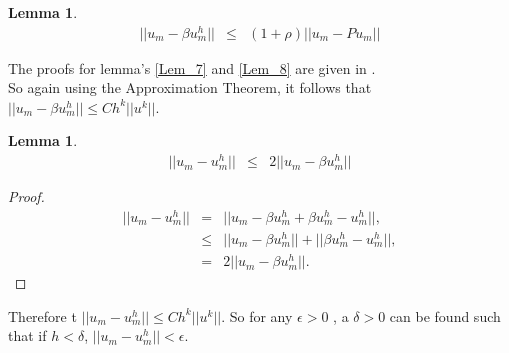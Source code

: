 \documentclass[../../main.tex]{subfiles}
\begin{document}
\newtheorem{Lem_8}[Lem_1]{Lemma} \label{Lem_8}
\begin{Lem_8}
	\begin{eqnarray*}
		||u_{m} - \beta u_{m}^{h}|| &\leq & \left(1+\rho\right)||u_{m}-Pu_{m}||
	\end{eqnarray*}
\end{Lem_8}
\begin{comment}
\begin{proof}
	\begin{eqnarray*}
	||u_{m} - \beta u_{m}^{h}|| & \leq & ||u_{m}-Pu_{m}|| + ||Pu_{m} - \beta u_{m}^{h}|| \\
				& \leq & \left(1+\rho\right)||u_{m}-Pu_{m}|| \ \ \textrm{ (by Lemma \ref{Lem_7})}
	\end{eqnarray*}
\end{proof}
\end{comment}

The proofs for lemma's \ref{Lem_7} and \ref{Lem_8} are given in \cite{SF73}.\\

So again using the Approximation Theorem, it follows that $||u_{m} - \beta u_{m}^{h}||\leq Ch^{k}||u^{k}||$.


\newtheorem{Lem_9}[Lem_1]{Lemma} \label{Lem_9}
\begin{Lem_9}
	\begin{eqnarray*}
		||u_{m} -  u_{m}^{h}|| &\leq & 2||u_{m}-\beta u^{h}_{m}||
	\end{eqnarray*}
\end{Lem_9}
\begin{proof}
	\begin{eqnarray*}
	||u_{m} - u_{m}^{h}|| &=& ||u_{m} - \beta u_{m}^{h} + \beta u_{m}^{h} - u_{m}^{h}||, \\
						& \leq & ||u_{m} - \beta u_{m}^{h}|| + ||\beta u_{m}^{h} - u_{m}^{h}||, \\
						& = & 2||u_{m} - \beta u_{m}^{h}||.	
	\end{eqnarray*}
\end{proof}

Therefore t $||u_{m} -  u_{m}^{h}|| \leq Ch^{k}||u^{k}||$. So for any $\epsilon >0$ , a $\delta >0$ can be found such that if $h < \delta$, $||u_{m} -  u_{m}^{h}|| < \epsilon$.
\end{document}

